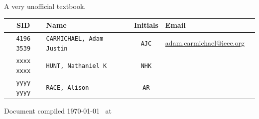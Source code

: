 \begin{titlingpage}
\begin{center}

\textsc{\LARGE \MyInstitution }\\[1.5cm]
\HRule \\[0.9cm]

{ \huge \bfseries \MyTitle }\\[0.4cm] \HRule \\
{ \small{A very unofficial textbook.} }
\vfill

\begin{tabularx}{\linewidth}{ c X c X X }
\hline
  SID & Name & Initials & Email \\
  \hline
  \texttt{4196 3539} & \texttt{CARMICHAEL, Adam Justin}  & \texttt{AJC} & \url{adam.carmichael@ieee.org} \\
  \texttt{xxxx xxxx} & \texttt{HUNT, Nathaniel K} & \texttt{NHK} & \\
  \texttt{yyyy yyyy} & \texttt{RACE, Alison} & \texttt{AR} & \\
\end{tabularx}

\vspace{1cm}
\small{Document compiled \today ~ at \currenttime}
\end{center}

\end{titlingpage}